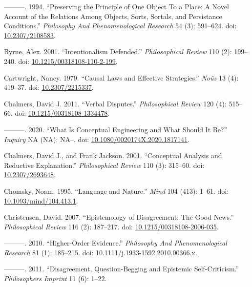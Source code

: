 \documentclass[
  10pt,
  letterpaper,
  DIV=11,
  numbers=noendperiod,
  twoside]{scrartcl}
\newlength{\cslhangindent}
\newenvironment{CSLReferences}[2] %
 {\begin{list}{}{%
  \setlength{\itemindent}{0pt}
  \setlength{\leftmargin}{0pt}
  \setlength{\parsep}{0pt}
  \ifodd #1
   \setlength{\leftmargin}{\cslhangindent}
   \setlength{\itemindent}{-1\cslhangindent}
  \fi
  \setlength{\itemsep}{#2\baselineskip}}}
 {\end{list}}
\begin{document}
\begin{CSLReferences}{1}{0}
---------. 1994. {``Preserving the Principle of One Object To a Place: A
Novel Account of the Relations Among Objects, Sorts, Sortals, and
Persistance Conditions.''} \emph{Philosophy And Phenomenological
Research} 54 (3): 591--624. doi:
\href{https://doi.org/10.2307/2108583}{10.2307/2108583}.

Byrne, Alex. 2001. {``Intentionalism Defended.''} \emph{Philosophical
Review} 110 (2): 199--240. doi:
\href{https://doi.org/10.1215/00318108-110-2-199}{10.1215/00318108-110-2-199}.

Cartwright, Nancy. 1979. {``Causal Laws and Effective Strategies.''}
\emph{Noûs} 13 (4): 419--37. doi:
\href{https://doi.org/10.2307/2215337}{10.2307/2215337}.

Chalmers, David J. 2011. {``Verbal Disputes.''} \emph{Philosophical
Review} 120 (4): 515--66. doi:
\href{https://doi.org/10.1215/00318108-1334478}{10.1215/00318108-1334478}.

---------. 2020. {``What Is Conceptual Engineering and What Should It
Be?''} \emph{Inquiry} NA (NA): NA--. doi:
\href{https://doi.org/10.1080/0020174X.2020.1817141}{10.1080/0020174X.2020.1817141}.

Chalmers, David J., and Frank Jackson. 2001. {``Conceptual Analysis and
Reductive Explanation.''} \emph{Philosophical Review} 110 (3): 315--60.
doi: \href{https://doi.org/10.2307/2693648}{10.2307/2693648}.

Chomsky, Noam. 1995. {``Language and Nature.''} \emph{Mind} 104 (413):
1--61. doi:
\href{https://doi.org/10.1093/mind/104.413.1}{10.1093/mind/104.413.1}.

Christensen, David. 2007. {``Epistemology of Disagreement: The Good
News.''} \emph{Philosophical Review} 116 (2): 187--217. doi:
\href{https://doi.org/10.1215/00318108-2006-035}{10.1215/00318108-2006-035}.

---------. 2010. {``Higher-Order Evidence.''} \emph{Philosophy And
Phenomenological Research} 81 (1): 185--215. doi:
\href{https://doi.org/10.1111/j.1933-1592.2010.00366.x}{10.1111/j.1933-1592.2010.00366.x}.

---------. 2011. {``Disagreement, Question-Begging and Epistemic
Self-Criticism.''} \emph{Philosophers Imprint} 11 (6): 1--22.


\end{CSLReferences}
\end{document}
